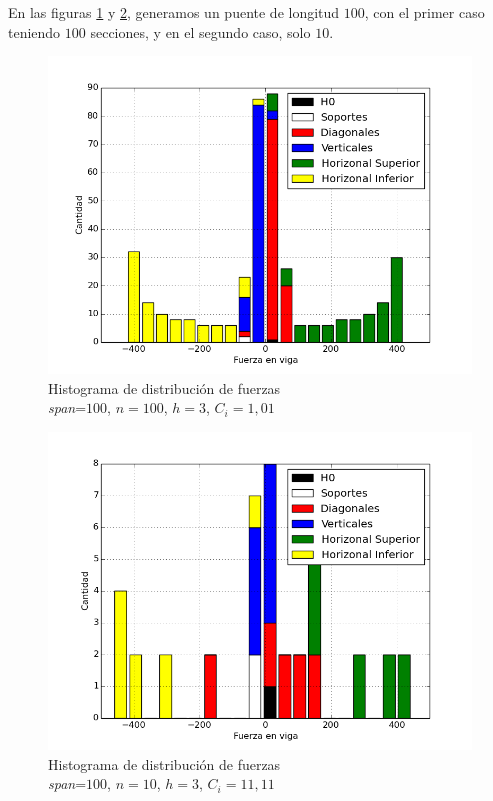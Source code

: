 En las figuras \ref{fig:hist_n100_C100} y \ref{fig:hist_n10_C100}, generamos un puente de longitud $100$, con el primer caso teniendo $100$ secciones, y en el segundo caso, solo $10$.

\begin{figure}[h!]
\begin{center}
\includegraphics[scale=0.5]{archivos/graficos/hist_n100_C100.png}
\caption{\label{fig:hist_n100_C100}Histograma de distribución de fuerzas\\
\textit{span}=$100$, $n=100$, $h=3$, $C_i=1,01$}
\end{center}
\end{figure}

\begin{figure}[h!]
\begin{center}
\includegraphics[scale=0.5]{archivos/graficos/hist_n10_C100.png}
\caption{\label{fig:hist_n10_C100}Histograma de distribución de fuerzas\\
\textit{span}=$100$, $n=10$, $h=3$, $C_i=11,11$}
\end{center}
\end{figure}


